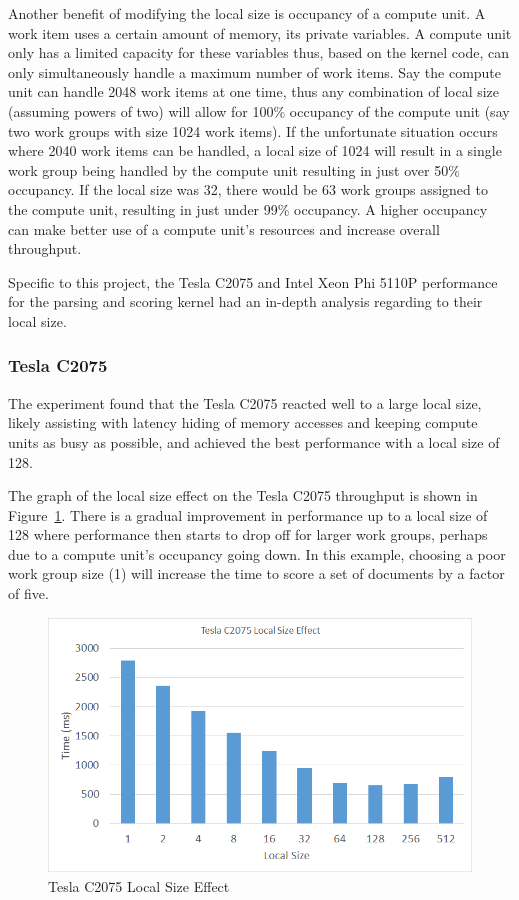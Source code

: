 Another benefit of modifying the local size is occupancy of a compute unit. A
work item uses a certain amount of memory, its private variables. A compute unit
only has a limited capacity for these variables thus, based on the kernel code,
can only simultaneously handle a maximum number of work items. Say the compute
unit can handle 2048 work items at one time, thus any combination of local size
(assuming powers of two) will allow for 100\% occupancy of the compute unit (say
two work groups with size 1024 work items). If the unfortunate situation occurs
where 2040 work items can be handled, a local size of 1024 will result in a
single work group being handled by the compute unit resulting in just over 50\%
occupancy. If the local size was 32, there would be 63 work groups assigned to
the compute unit, resulting in just under 99\% occupancy. A higher occupancy can
make better use of a compute unit's resources and increase overall throughput.

Specific to this project, the Tesla C2075 and Intel Xeon Phi 5110P performance
for the parsing and scoring kernel had an in-depth analysis regarding to their
local size.

\subsubsection{Tesla C2075}

The experiment found that the Tesla C2075 reacted well to a large local size,
likely assisting with latency hiding of memory accesses and keeping compute
units as busy as possible, and achieved the best performance with a local size
of 128.

The graph of the local size effect on the Tesla C2075 throughput is shown in
Figure~\ref{fig:teslaLocalSize}. There is a gradual improvement in performance
up to a local size of 128 where performance then starts to drop off for larger
work groups, perhaps due to a compute unit's occupancy going down. In this
example, choosing a poor work group size (1) will increase the time to score a
set of documents by a factor of five.

\begin{figure}[H]
\includegraphics[width=\linewidth]{images/teslaLocalSize.png}
\caption{Tesla C2075 Local Size Effect}
\label{fig:teslaLocalSize}
\end{figure}

